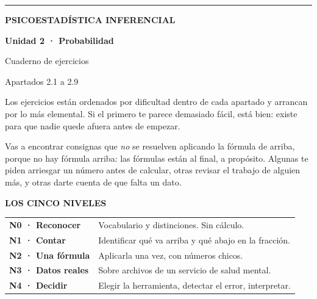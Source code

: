 \begin{titlepage}
\thispagestyle{empty}
\vspace*{1.6cm}
{\color{fundamentos}\rule{\linewidth}{3pt}}\par
\vspace{0.5em}
{\footnotesize\sffamily\bfseries\color{apagado}\MakeUppercase{Psicoestadística Inferencial}}\par
\vspace{-0.2em}
{\serif\fontsize{34}{38}\selectfont\bfseries Unidad 2 · Probabilidad}\par
\vspace{0.1em}
{\serif\fontsize{22}{26}\selectfont Cuaderno de ejercicios}\par
\vspace{0.4em}
{\color{apagado}\sffamily Apartados 2.1 a 2.9}\par
\vspace{1.8em}

Los ejercicios están ordenados por dificultad dentro de cada apartado y
arrancan por lo más elemental. Si el primero te parece demasiado fácil, está
bien: existe para que nadie quede afuera antes de empezar.\par
\vspace{0.6em}
Vas a encontrar consignas que \emph{no} se resuelven aplicando la fórmula de
arriba, porque no hay fórmula arriba: las fórmulas están al final, a propósito.
Algunas te piden arriesgar un número antes de calcular, otras revisar el
trabajo de alguien más, y otras darte cuenta de que falta un dato.\par

\vspace{1.4em}
{\footnotesize\sffamily\bfseries\color{apagado}\MakeUppercase{Los cinco niveles}}\par
\vspace{0.4em}
\begin{tabular}{@{}p{3cm}p{10.2cm}@{}}
\toprule
\textcolor{nivelcero}{\textbf{N0 · Reconocer}}   & Vocabulario y distinciones. Sin cálculo. \\[0.35em]
\textcolor{niveluno}{\textbf{N1 · Contar}}       & Identificar qué va arriba y qué abajo en la fracción. \\[0.35em]
\textcolor{niveldos}{\textbf{N2 · Una fórmula}}  & Aplicarla una vez, con números chicos. \\[0.35em]
\textcolor{niveltres}{\textbf{N3 · Datos reales}}& Sobre archivos de un servicio de salud mental. \\[0.35em]
\textcolor{nivelcuatro}{\textbf{N4 · Decidir}}   & Elegir la herramienta, detectar el error, interpretar. \\
\bottomrule
\end{tabular}\par


\end{titlepage}
